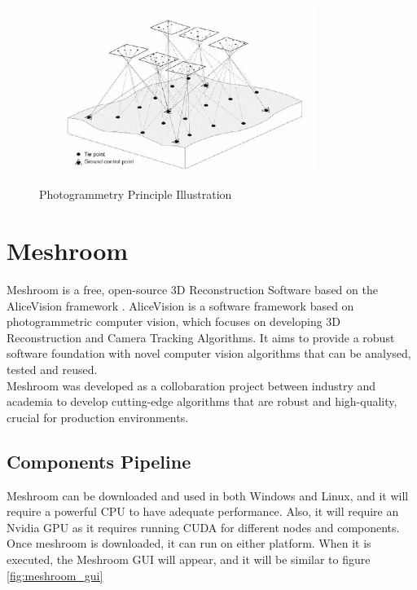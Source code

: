 \documentclass[12pt]{report}
\begin{document}
\begin{figure}[h]
  \centering
  \includegraphics[width=0.8\textwidth]{photogrammetry.png}
  \caption{Photogrammetry Principle Illustration}\cite[]{photogrammetry_def}
  \label{fig:photogrammetry_principle} 
\end{figure}


\section{Meshroom}
\label{section:meshroom}
Meshroom is a free, open-source 3D Reconstruction Software based on the AliceVision framework .
AliceVision is a software framework based on photogrammetric computer vision, which focuses on developing 3D Reconstruction and Camera Tracking Algorithms.
It aims to provide a robust software foundation with novel computer vision algorithms that can be analysed, tested and reused.\\
Meshroom was developed as a collobaration project between industry and academia to develop cutting-edge algorithms that are robust and high-quality, crucial for production environments.

\subsection*{Components Pipeline}
Meshroom can be downloaded and used in both Windows and Linux, and it will require a powerful CPU  to have adequate performance. Also, it will require an Nvidia GPU as it requires running CUDA for different nodes and components.
Once meshroom is downloaded, it can run on either platform. When it is executed, the Meshroom GUI will appear, and it will be similar to figure \ref{fig:meshroom_gui}
\end{document}
